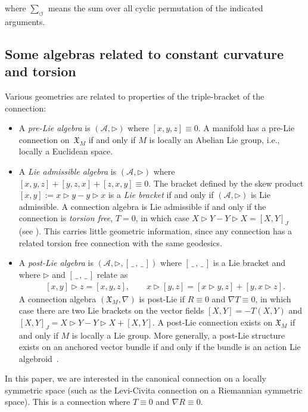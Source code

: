 \documentclass[10pt,a4paper]{amsart}
\newcommand{\noarg}{\,\_\,}
\numberwithin{equation}{section}
\begin{document}
where $\sum_{\circlearrowleft}$ means the sum over all cyclic permutation of the indicated arguments.

\subsection{Some algebras related to constant curvature and torsion}

Various geometries are related to properties of the triple-bracket of the connection:
\begin{itemize}\itemsep=0pt
 \item A \emph{pre-Lie algebra} is $(\mathcal{A},\rhd)$ where $[x,y,z] \equiv 0$. A manifold has a pre-Lie connection on~$\mathfrak{X}_M$ if and only if $M$ is locally an Abelian Lie group, i.e., locally a Euclidean space.
 \item A \emph{Lie admissible algebra} is $(\mathcal{A},\rhd)$ where $[x,y,z]+[y,z,x] + [z,x,y]\equiv 0$. The bracket defined by the skew product $[x,y] := x\rhd y - y\rhd x$ is a \emph{Lie bracket} if and only if $(\mathcal{A},\rhd)$ is Lie admissible. A connection algebra is Lie admissible if and only if the connection is \emph{torsion free}, $T=0$, in which case $X\rhd Y -Y\rhd X = [X,Y]_J$ (see \cite[Proposition 2.13]{MK_Stern_Verdier_20}). This carries little geometric information, since any connection has a related torsion free connection with the same geodesics.
 \item A \emph{post-Lie algebra} is $(\mathcal{A},\rhd,[\noarg,\noarg])$ where $[\noarg,\noarg]$ is a Lie bracket and where $\rhd$ and $[\noarg,\noarg]$ relate as
 \begin{align*}
 & [x,y]\rhd z= [x,y,z],\qquad x\rhd [y,z]= [x\rhd y,z]+ [y,x\rhd z].
 \end{align*}
 A connection algebra $(\mathfrak{X}_M,\nabla)$ is post-Lie if $R\equiv 0$ and $\nabla T\equiv 0$, in which case there are two Lie brackets on the vector fields $[X,Y] = -T(X,Y)$ and $[X,Y]_J = X\rhd Y-Y\rhd X + [X,Y]$. A post-Lie connection exists on $\mathfrak{X}_M$ if and only if $M$ is locally a Lie group. More generally, a post-Lie structure exists on an anchored vector bundle if and only if the bundle is an action Lie algebroid~\cite{MK_Lundervold_2013}.%
\end{itemize}

In this paper, we are interested in the canonical connection on a locally symmetric space (such as the Levi-Civita connection on a Riemannian symmetric space). This is a connection where $T \equiv 0$ and $\nabla R\equiv 0$.
\end{document}
